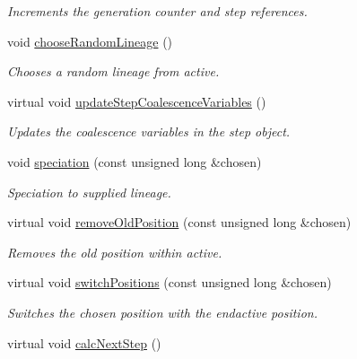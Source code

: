 \begin{DoxyCompactItemize}
\begin{DoxyCompactList}\small\item\em Increments the generation counter and step references. \end{DoxyCompactList}\item 
void \hyperlink{class_tree_a23803bddf46ad28a1bdd46bf05693b1f}{choose\+Random\+Lineage} ()
\begin{DoxyCompactList}\small\item\em Chooses a random lineage from active. \end{DoxyCompactList}\item 
virtual void \hyperlink{class_tree_ad65e94936001675b8bc908cf77e0cb53}{update\+Step\+Coalescence\+Variables} ()\hypertarget{class_tree_ad65e94936001675b8bc908cf77e0cb53}{}\label{class_tree_ad65e94936001675b8bc908cf77e0cb53}

\begin{DoxyCompactList}\small\item\em Updates the coalescence variables in the step object. \end{DoxyCompactList}\item 
void \hyperlink{class_tree_a05c9e44f1a4d7af83e65b6c4565b1b28}{speciation} (const unsigned long \&chosen)
\begin{DoxyCompactList}\small\item\em Speciation to supplied lineage. \end{DoxyCompactList}\item 
virtual void \hyperlink{class_tree_ad74c05729c9e5235ab0fa6e34260093a}{remove\+Old\+Position} (const unsigned long \&chosen)
\begin{DoxyCompactList}\small\item\em Removes the old position within active. \end{DoxyCompactList}\item 
virtual void \hyperlink{class_tree_ab1be13d2e99a4445a7cc84f907e0c90e}{switch\+Positions} (const unsigned long \&chosen)
\begin{DoxyCompactList}\small\item\em Switches the chosen position with the endactive position. \end{DoxyCompactList}\item 
virtual void \hyperlink{class_tree_a0dc015aa5a45d2a75d80456d680172ac}{calc\+Next\+Step} ()\hypertarget{class_tree_a0dc015aa5a45d2a75d80456d680172ac}{}\label{class_tree_a0dc015aa5a45d2a75d80456d680172ac}


\end{DoxyCompactItemize}
